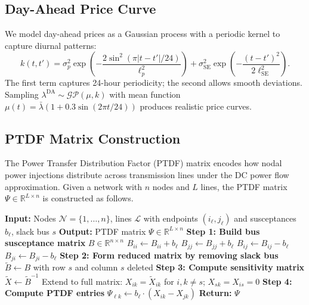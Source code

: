 \documentclass[11pt]{article}
\begin{document}
\subsection{Day-Ahead Price Curve}

We model day-ahead prices as a Gaussian process with a periodic kernel to capture diurnal patterns:
\begin{equation}
    k(t, t') = \sigma^2_p \exp\left(-\frac{2\sin^2(\pi|t-t'|/24)}{\ell^2_p}\right) + \sigma^2_{\text{SE}} \exp\left(-\frac{(t-t')^2}{2\ell^2_{\text{SE}}}\right).
\end{equation}
The first term captures 24-hour periodicity; the second allows smooth deviations. Sampling $\lambda^{\text{DA}} \sim \mathcal{GP}(\mu, k)$ with mean function $\mu(t) = \bar{\lambda}(1 + 0.3\sin(2\pi t / 24))$ produces realistic price curves.

\subsection{PTDF Matrix Construction}

The Power Transfer Distribution Factor (PTDF) matrix encodes how nodal power injections distribute across transmission lines under the DC power flow approximation. Given a network with $n$ nodes and $L$ lines, the PTDF matrix $\Psi \in \mathbb{R}^{L \times n}$ is constructed as follows.

\begin{algorithm}[H]
\caption{PTDF Matrix Construction}
\begin{algorithmic}[1]
\State \textbf{Input:} Nodes $\mathcal{N} = \{1, \ldots, n\}$, lines $\mathcal{L}$ with endpoints $(i_\ell, j_\ell)$ and susceptances $b_\ell$, slack bus $s$
\State \textbf{Output:} PTDF matrix $\Psi \in \mathbb{R}^{L \times n}$
\State
\State \textbf{Step 1: Build bus susceptance matrix} $B \in \mathbb{R}^{n \times n}$
    \State $B_{ii} \gets B_{ii} + b_\ell$
    \State $B_{jj} \gets B_{jj} + b_\ell$
    \State $B_{ij} \gets B_{ij} - b_\ell$
    \State $B_{ji} \gets B_{ji} - b_\ell$
\EndFor
\State
\State \textbf{Step 2: Form reduced matrix by removing slack bus}
\State $\tilde{B} \gets B$ with row $s$ and column $s$ deleted 
\State
\State \textbf{Step 3: Compute sensitivity matrix}
\State $\tilde{X} \gets \tilde{B}^{-1}$
\State Extend to full matrix: $X_{ik} = \tilde{X}_{ik}$ for $i,k \neq s$; $X_{sk} = X_{is} = 0$
\State
\State \textbf{Step 4: Compute PTDF entries}
        \State $\Psi_{\ell k} \gets b_\ell \cdot (X_{ik} - X_{jk})$
    \EndFor
\EndFor
\State \textbf{Return:} $\Psi$
\end{algorithmic}
\end{algorithm}
\end{document}
